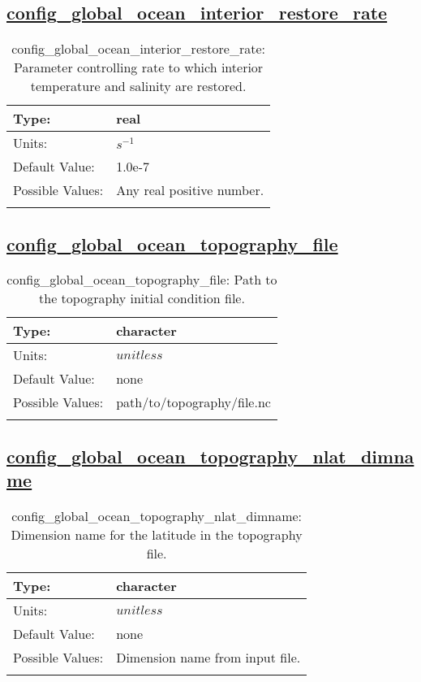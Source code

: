 \subsection[config\_global\_ocean\_interior\_restore\_rate]{\hyperref[sec:nm_tab_global_ocean]{config\_global\_ocean\_interior\_restore\_rate}}
\label{subsec:nm_sec_config_global_ocean_interior_restore_rate}
\begin{center}
\begin{longtable}{| p{2.0in} || p{4.0in} |}
    \hline
    Type: & real \\
    \hline
    Units: & $s^{-1}$ \\
    \hline
    Default Value: & 1.0e-7 \\
    \hline
    Possible Values: & Any real positive number. \\
    \hline
    \caption{config\_global\_ocean\_interior\_restore\_rate: Parameter controlling rate to which interior temperature and salinity are restored.}
\end{longtable}
\end{center}
\subsection[config\_global\_ocean\_topography\_file]{\hyperref[sec:nm_tab_global_ocean]{config\_global\_ocean\_topography\_file}}
\label{subsec:nm_sec_config_global_ocean_topography_file}
\begin{center}
\begin{longtable}{| p{2.0in} || p{4.0in} |}
    \hline
    Type: & character \\
    \hline
    Units: & $unitless$ \\
    \hline
    Default Value: & none \\
    \hline
    Possible Values: & path/to/topography/file.nc \\
    \hline
    \caption{config\_global\_ocean\_topography\_file: Path to the topography initial condition file.}
\end{longtable}
\end{center}
\subsection[config\_global\_ocean\_topography\_nlat\_dimname]{\hyperref[sec:nm_tab_global_ocean]{config\_global\_ocean\_topography\_nlat\_dimname}}
\label{subsec:nm_sec_config_global_ocean_topography_nlat_dimname}
\begin{center}
\begin{longtable}{| p{2.0in} || p{4.0in} |}
    \hline
    Type: & character \\
    \hline
    Units: & $unitless$ \\
    \hline
    Default Value: & none \\
    \hline
    Possible Values: & Dimension name from input file. \\
    \hline
    \caption{config\_global\_ocean\_topography\_nlat\_dimname: Dimension name for the latitude in the topography file.}
\end{longtable}
\end{center}
